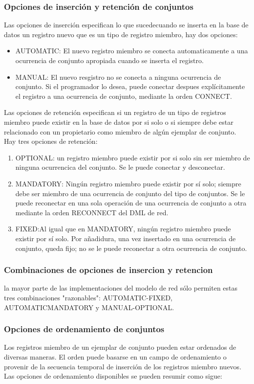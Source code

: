 \documentclass[12pts, A3 ,twosides]{article}
\begin{document}
\subsubsection{Opciones de inserción y retención de conjuntos}
Las opciones de inserción especifican lo que sucedecuando se inserta en la base de datos un registro nuevo que es un tipo de registro miembro, hay dos opciones:
\begin{itemize}
\item AUTOMATIC: El nuevo registro miembro se conecta automaticamente a una ocurrencia de conjunto apropiada cuando se inserta el registro.
\item MANUAL: El nuevo resgistro no se conecta a ninguna ocurrencia de conjunto. Si el programador lo desea, puede conectar despues explícitamente el registro a una ocurrencia de conjunto, mediante la orden CONNECT.
\end{itemize} 
Las opciones de retención especifican si un registro de un tipo de registros miembro puede existir en la base de datos por si solo o si siempre debe estar relacionado con un propietario como miembro de algún ejemplar de conjunto. Hay tres opciones de retención:
\begin{enumerate}
\item OPTIONAL: un registro miembro puede existir por si solo sin ser miembro de ninguna ocurrencica del conjunto. Se le puede conectar y desconectar.
\item MANDATORY: Ningún registro miembro puede existir por sí solo; siempre debe ser miembro de una ocurrencia de conjunto del tipo de conjuntos. Se le puede reconectar en una sola operación de una ocurrencia de conjunto a otra mediante la orden RECONNECT del DML de red.
\item FIXED:Al igual que en MANDATORY, ningún registro miembro puede existir por sí solo. Por añadidura, una vez insertado en una ocurrencia de conjunto, queda fijo; no se le puede reconectar a otra ocurrencia de conjunto.
\end{enumerate}

\subsubsection{Combinaciones de opciones de insercion y retencion}
la mayor parte de las implementaciones del modelo de red sólo permiten estas tres combinaciones "razonables": AUTOMATIC-FIXED, AUTOMATICMANDATORY y MANUAL-OPTIONAL.

\subsubsection{Opciones de ordenamiento de conjuntos}
Los registros miembro de un ejemplar de conjunto pueden estar ordenados de diversas maneras. El orden puede basarse en un campo de ordenamiento o provenir de la secuencia temporal de inserción de los registros miembro nuevos. Las opciones de ordenamiento disponibles se pueden resumir como sigue:
\end{document}
